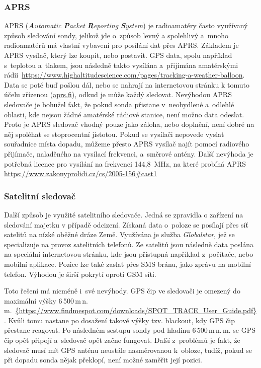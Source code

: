 \documentclass[twoside]{ctuthesis}
\theoremstyle{plain}
\theoremstyle{definition}
\theoremstyle{note}
\begin{document}
			\subsubsection{APRS}
			APRS (\textit{\textbf{A}utomatic \textbf{P}acket \textbf{R}eporting \textbf{S}ystem}) je radioamatéry často využívaný způsob sledování sondy, jelikož jde o~způsob levný a spolehlivý a~mnoho radioamatérů má vlastní vybavení pro posílání dat přes APRS. Základem je APRS vysílač, který lze koupit, nebo postavit. GPS data, spolu například s~teplotou a~tlakem, jsou následně takto vysílána a~přijímána amatérskými rádii~\url{https://www.highaltitudescience.com/pages/tracking-a-weather-balloon}. Data se poté buď pošlou dál, nebo se nahrají na internetovou stránku k tomuto účelu zřízenou (\url{aprs.fi}), odkud je může každý sledovat.
			Nevýhodou APRS sledovače je bohužel fakt, že pokud sonda přistane v~neobydlené a~odlehlé oblasti, kde nejsou žádné amatérské rádiové stanice, není možno data odeslat. Proto je APRS sledovač vhodný pouze jako záloha, nebo doplnění, není dobré na něj spoléhat se stoprocentní jistotou. Pokud se vysílači nepovede vyslat souřadnice místa dopadu, můžeme přesto APRS vysílač najít pomocí radiového přijímače, naladěného na vysílací frekvenci, a~směrové antény. Další nevýhoda je potřebná licence pro vysílání na frekvenci 144,8~MHz, na které probíhá APRS \url{https://www.zakonyprolidi.cz/cs/2005-156#cast1}


			\subsubsection{Satelitní sledovač}
			Další způsob je využité satelitního sledovače. Jedná se zpravidla o zařízení na sledování majetku v případě odcizení. Získaná data o~poloze se posílají přes síť satelitů na nízké oběžné dráze Země. Využívána je služba \textit{Globalstar}, jež se specializuje na provoz satelitních telefonů. Ze satelitů jsou následně data poslána na speciální internetovou stránku, kde jsou přístupná například z~počítače, nebo mobilní aplikace. Pozice lze také zaslat přes SMS bránu, jako zprávu na mobilní telefon. Výhodou je širší pokrytí oproti GSM síti. 

			Toto řešení má nicméně i~své nevýhody. GPS čip ve sledovači je omezený do maximální výšky 6\,500\,m\,n.\,m.~\url{{https://www.findmespot.com/downloads/SPOT_TRACE_User_Guide.pdf}}. Kvůli tomu nastane po dosažení takové výšky tzv. blackout, kdy GPS čip přestane reagovat. Po následném sestupu sondy pod hladinu 6\,500\,m\,n.\,m. se GPS čip opět připojí a~sledovač opět začne fungovat. Další z~problémů je fakt, že sledovač musí mít GPS anténu neustále nasměrovanou k~obloze, tudíž, pokud se při dopadu sonda nějak překlopí, není možné zaměřit její pozici.
\end{document}
